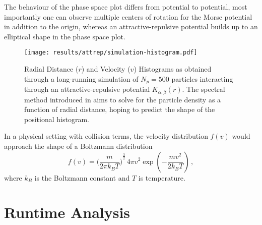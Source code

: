 The behaviour of the phase space plot differs from potential to potential, most importantly one can observe multiple centers of rotation for the Morse potential in addition to the origin, whereas an attractive-repulsive potential builds up to an elliptical shape in the phase space plot.

\begin{figure}[H]
  \centering
  \label{fig:simulation-histogram}
  \texttt{[image: results/attrep/simulation-histogram.pdf]}
  \caption[Radial Distance and Velocity Histograms of attractive-repulsive Simulation Output in 1D]{Radial Distance ($r$) and Velocity ($v$) Histograms as obtained through a long-running simulation of $N_p = 500$ particles interacting through an attractive-repulsive potential $K_{\alpha, \beta}(r)$. The spectral method introduced in  aims to solve for the particle density as a function of radial distance, hoping to predict the shape of the positional histogram.}
\end{figure}

In a physical setting with collision terms, the velocity distribution $f(v)$ would approach the shape of a Boltzmann distribution
$$f(v)={\bigg(\frac{m}{2\pi k_B T}\bigg)}^{\frac {3}{2}}\,4\pi v^{2}\exp \left(-{\frac {mv^{2}}{2k_B T}}\right)\,,$$
where $k_B$ is the Boltzmann constant and $T$ is temperature.

\section{Runtime Analysis}
\hierKoennteIhreWerbungStehen
